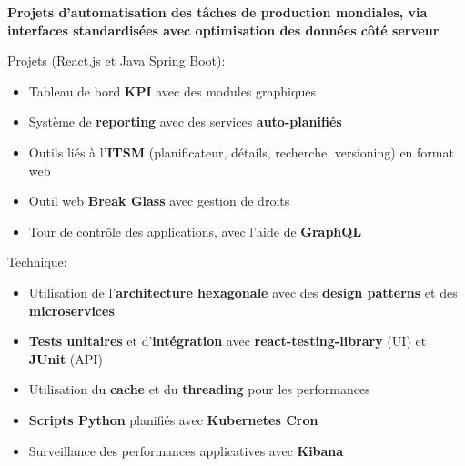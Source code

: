 \documentclass[10pt,a4paper,ragged2e,withhyper]{altacv}
\begin{document}


\makecvheader

\smallskip
{}

\vspace{-.25\baselineskip}
\textbf{\footnotesize{Projets d'automatisation des tâches de production mondiales, via interfaces standardisées avec optimisation des données côté serveur}}
\smallskip

\vspace{-.5\baselineskip}
\begin{minipage}[t]{0.45\textwidth}
  \vspace{0pt}
  Projets (React.js et Java Spring Boot):
  \begin{itemize}
    \item Tableau de bord \textbf{KPI} avec des modules graphiques
    \item Système de \textbf{reporting} avec des services \textbf{auto-planifiés}
    \item Outils liés à l'\textbf{ITSM} (planificateur, détails, recherche, versioning) en format web
    \item Outil web \textbf{Break Glass} avec gestion de droits
    \item Tour de contrôle des applications, avec l'aide de \textbf{GraphQL}
  \end{itemize}
\end{minipage}
\hfill
\begin{minipage}[t]{0.45\textwidth}
  \vspace{0pt}
  Technique:
  \begin{itemize}
    \item Utilisation de l'\textbf{architecture hexagonale} avec des \textbf{design patterns} et des \textbf{microservices}
    \item \textbf{Tests unitaires} et d'\textbf{intégration} avec \textbf{react-testing-library} (UI) et \textbf{JUnit} (API)
    \item Utilisation du \textbf{cache} et du \textbf{threading} pour les performances
    \item \textbf{Scripts Python} planifiés avec \textbf{Kubernetes Cron}
    \item Surveillance des performances applicatives avec \textbf{Kibana}
  \end{itemize}
\end{minipage}
\medskip
\end{document}
